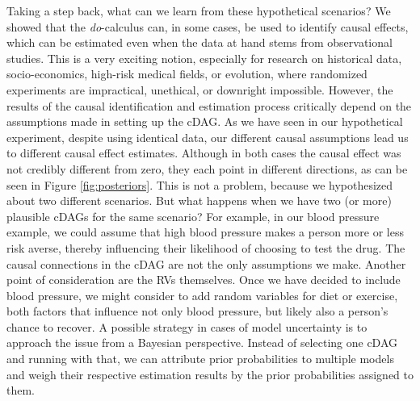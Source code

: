 \documentclass[nobib]{tufte-handout}
\newcommand{\docalc}{\emph{do}-calculus\xspace}
\begin{document}
Taking a step back, what can we learn from these hypothetical scenarios?
We showed that the \docalc can, in some cases, be used to identify causal effects, which can be estimated even when the data at hand stems from observational studies. 
This is a very exciting notion, especially for research on historical data, socio-economics, high-risk medical fields, or evolution, where randomized experiments are impractical, unethical, or downright impossible. 
However, the results of the causal identification and estimation process critically depend on the assumptions made in setting up the cDAG.
As we have seen in our hypothetical experiment, despite using identical data, our different causal assumptions lead us to different causal effect estimates.
Although in both cases the causal effect was not credibly different from zero, they each point in different directions, as can be seen in Figure \ref{fig:posteriors}.
This is not a problem, because we hypothesized about two different scenarios.
But what happens when we have two (or more) plausible cDAGs for the same scenario?
For example, in our blood pressure example, we could assume that high blood pressure makes a person more or less risk averse, thereby influencing their likelihood of choosing to test the drug.
The causal connections in the cDAG are not the only assumptions we make. 
Another point of consideration are the RVs themselves. 
Once we have decided to include blood pressure, we might consider to add random variables for diet or exercise, both factors that influence not only blood pressure, but likely also a person's chance to recover.
A possible strategy in cases of model uncertainty is to approach the issue from a Bayesian perspective.
Instead of selecting one cDAG and running with that, we can attribute prior probabilities to multiple models and weigh their respective estimation results by the prior probabilities assigned to them.
\end{document}
